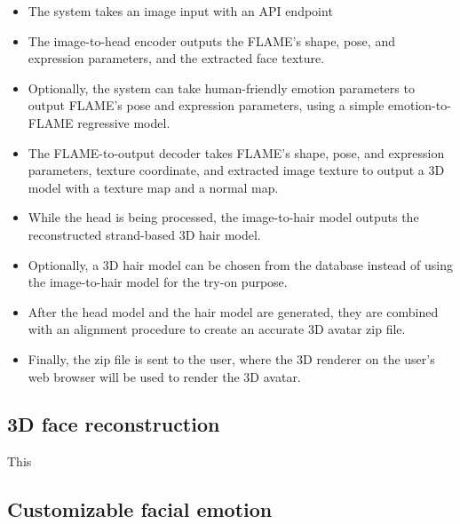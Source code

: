 \begin{itemize}
    \item The system takes an image input with an API endpoint
    \item The image-to-head encoder outputs the FLAME's shape, pose, and expression parameters, and the extracted face texture.
    \item Optionally, the system can take human-friendly emotion parameters to output FLAME's pose and expression parameters, using a simple emotion-to-FLAME regressive model.
    \item The FLAME-to-output decoder takes FLAME's shape, pose, and expression parameters, texture coordinate, and extracted image texture to output a 3D model with a texture map and a normal map.
    \item While the head is being processed, the image-to-hair model outputs the reconstructed strand-based 3D hair model.
    \item Optionally, a 3D hair model can be chosen from the database instead of using the image-to-hair model for the try-on purpose.
    \item After the head model and the hair model are generated, they are combined with an alignment procedure to create an accurate 3D avatar zip file.
    \item Finally, the zip file is sent to the user, where the 3D renderer on the user's web browser will be used to render the 3D avatar.
\end{itemize}


\subsection{3D face reconstruction}
This

\subsection{Customizable facial emotion}

